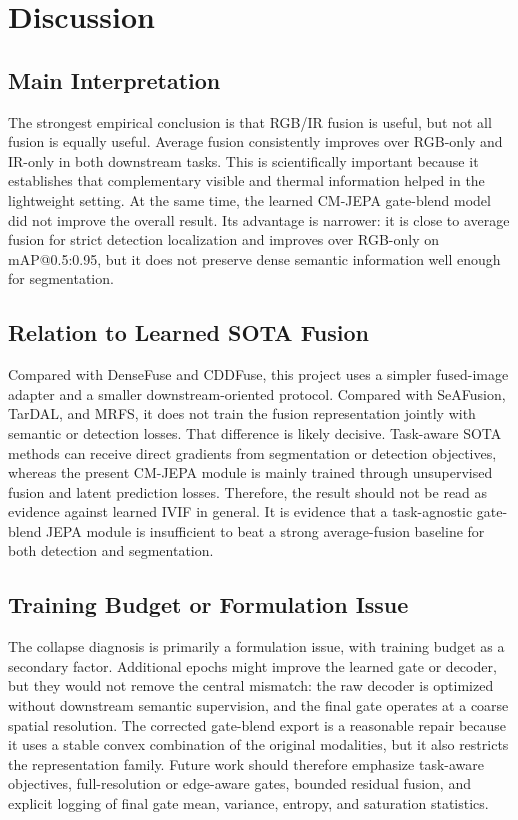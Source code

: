 \documentclass[conference,a4paper]{IEEEtran}
\begin{document}
\section{Discussion}
\subsection{Main Interpretation}
The strongest empirical conclusion is that RGB/IR fusion is useful, but not all fusion is equally useful. Average fusion consistently improves over RGB-only and IR-only in both downstream tasks. This is scientifically important because it establishes that complementary visible and thermal information helped in the lightweight setting. At the same time, the learned CM-JEPA gate-blend model did not improve the overall result. Its advantage is narrower: it is close to average fusion for strict detection localization and improves over RGB-only on mAP@0.5:0.95, but it does not preserve dense semantic information well enough for segmentation.

\subsection{Relation to Learned SOTA Fusion}
Compared with DenseFuse and CDDFuse, this project uses a simpler fused-image adapter and a smaller downstream-oriented protocol. Compared with SeAFusion, TarDAL, and MRFS, it does not train the fusion representation jointly with semantic or detection losses. That difference is likely decisive. Task-aware SOTA methods can receive direct gradients from segmentation or detection objectives, whereas the present CM-JEPA module is mainly trained through unsupervised fusion and latent prediction losses. Therefore, the result should not be read as evidence against learned IVIF in general. It is evidence that a task-agnostic gate-blend JEPA module is insufficient to beat a strong average-fusion baseline for both detection and segmentation.

\subsection{Training Budget or Formulation Issue}
The collapse diagnosis is primarily a formulation issue, with training budget as a secondary factor. Additional epochs might improve the learned gate or decoder, but they would not remove the central mismatch: the raw decoder is optimized without downstream semantic supervision, and the final gate operates at a coarse spatial resolution. The corrected gate-blend export is a reasonable repair because it uses a stable convex combination of the original modalities, but it also restricts the representation family. Future work should therefore emphasize task-aware objectives, full-resolution or edge-aware gates, bounded residual fusion, and explicit logging of final gate mean, variance, entropy, and saturation statistics.
\end{document}
